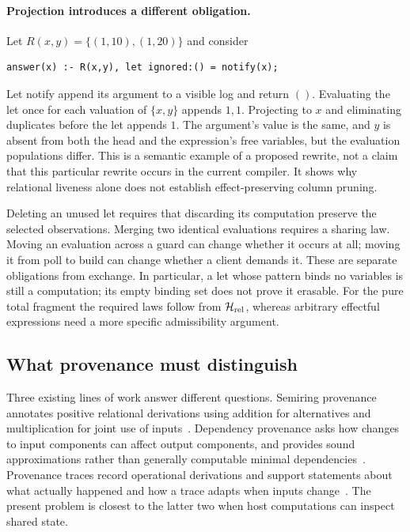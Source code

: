 \paragraph{Projection introduces a different obligation.}
Let $R(x,y)=\{(1,10),(1,20)\}$ and consider
\begin{lstlisting}
answer(x) :- R(x,y), let ignored:() = notify(x);
\end{lstlisting}
Let notify append its argument to a visible log and return $()$. Evaluating
the let once for each valuation of $\{x,y\}$ appends $1,1$. Projecting to $x$
and eliminating duplicates before the let appends $1$. The argument's value
is the same, and $y$ is absent from both the head and the expression's free
variables, but the evaluation populations differ. This is a semantic example
of a proposed rewrite, not a claim that this particular rewrite occurs in the
current compiler. It shows why relational liveness alone does not establish
effect-preserving column pruning.

Deleting an unused let requires that discarding its computation preserve the
selected observations. Merging two identical evaluations requires a sharing
law. Moving an evaluation across a guard can change whether it occurs at all;
moving it from poll to build can change whether a client demands it. These
are separate obligations from exchange. In particular, a let whose pattern
binds no variables is still a computation; its empty binding set does not
prove it erasable. For the pure total fragment the required laws follow from
$\mathcal H_{\rm rel}$, whereas arbitrary effectful expressions need a more
specific admissibility argument.

\subsection{What provenance must distinguish}
\label{sec:provenance-model}
Three existing lines of work answer different questions. Semiring provenance
annotates positive relational derivations using addition for alternatives
and multiplication for joint use of inputs~\cite{prov-semiring}. Dependency
provenance asks how changes to input components can affect output components,
and provides sound approximations rather than generally computable minimal
dependencies~\cite{prov-dependency}. Provenance traces record operational
derivations and support statements about what actually happened and how a
trace adapts when inputs change~\cite{prov-traces}. The present problem is
closest to the latter two when host computations can inspect shared state.

